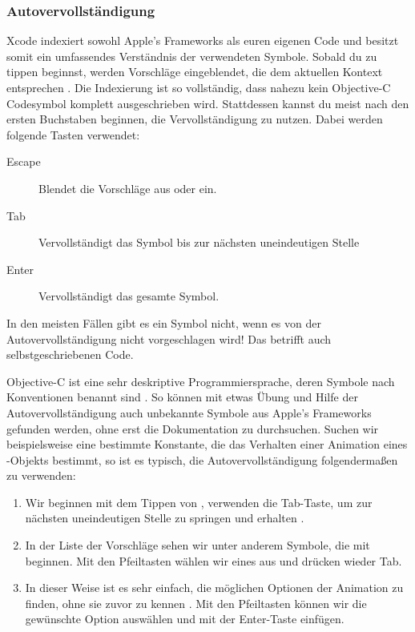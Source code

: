 \documentclass[parskip=half, final]{scrreprt}
\begin{document}
\subsubsection{Autovervollständigung}

Xcode indexiert sowohl Apple's Frameworks als euren eigenen Code und besitzt somit ein umfassendes Verständnis der verwendeten Symbole. Sobald du zu tippen beginnst, werden Vorschläge eingeblendet, die dem aktuellen Kontext entsprechen . Die Indexierung ist so vollständig, dass nahezu kein Objective-C Codesymbol komplett ausgeschrieben wird. Stattdessen kannst du meist nach den ersten Buchstaben beginnen, die Vervollständigung zu nutzen. Dabei werden folgende Tasten verwendet:
\begin{description}
\item[Escape] Blendet die Vorschläge aus oder ein.
\item[Tab] Vervollständigt das Symbol bis zur nächsten uneindeutigen Stelle
\item[Enter] Vervollständigt das gesamte Symbol.
\end{description}


In den meisten Fällen gibt es ein Symbol nicht, wenn es von der Autovervollständigung nicht vorgeschlagen wird! Das betrifft auch selbstgeschriebenen Code.

Objective-C ist eine sehr deskriptive Programmiersprache, deren Symbole nach Konventionen benannt sind . So können mit etwas Übung und Hilfe der Autovervollständigung auch unbekannte Symbole aus Apple's Frameworks gefunden werden, ohne erst die Dokumentation zu durchsuchen. Suchen wir beispielsweise eine bestimmte Konstante, die das Verhalten einer Animation eines -Objekts bestimmt, so ist es typisch, die Autovervollständigung folgendermaßen zu verwenden:
\begin{enumerate}
\item Wir beginnen mit dem Tippen von , verwenden die Tab-Taste, um zur nächsten uneindeutigen Stelle zu springen und erhalten .
\item In der Liste der Vorschläge sehen wir unter anderem Symbole, die mit  beginnen. Mit den Pfeiltasten wählen wir eines aus und drücken wieder Tab.
\item In dieser Weise ist es sehr einfach, die möglichen Optionen der Animation zu finden, ohne sie zuvor zu kennen . Mit den Pfeiltasten können wir die gewünschte Option auswählen und mit der Enter-Taste einfügen.
\end{enumerate}
\end{document}
